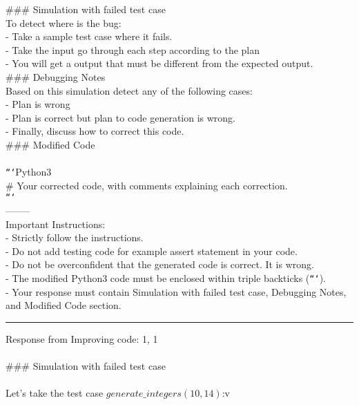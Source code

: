 \#\#\# Simulation with failed test case \\
To detect where is the bug: \\
    - Take a sample test case where it fails. \\
    - Take the input go through each step according to the plan \\
    - You will get a output that must be different from the expected output.  \\

\#\#\# Debugging Notes \\
Based on this simulation detect any of the following cases: \\
    - Plan is wrong \\
    - Plan is correct but plan to code generation is wrong. \\

- Finally, discuss how to correct this code. \\

\#\#\# Modified Code \\
 \\
\texttt{```}Python3 \\
\# Your corrected code, with comments explaining each correction. \\
\texttt{```} \\

-------- \\
\*\*Important Instructions:\*\* \\
- Strictly follow the instructions. \\
- Do not add testing code for example assert statement in your code. \\
- Do not be overconfident that the generated code is correct. It is wrong. \\
- The modified \*\*Python3\*\* code must be enclosed within triple backticks (\texttt{```}). \\
- Your response must contain \*\*Simulation with failed test case\*\*, \*\*Debugging Notes\*\*, and \*\*Modified Code\*\* section. \\



\vspace{0.5cm} \hrule   \vspace{0.5cm}
Response from Improving code: 1, 1 \\
 \\

\#\#\# Simulation with failed test case \\
 \\
Let's take the test case $generate\_integers(10, 14)$:v

